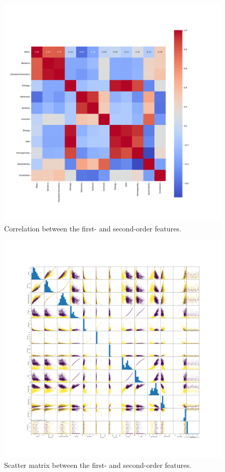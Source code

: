 \begin{figure}[H]
    \centering
    \includegraphics[width=\textwidth]{plots/correlation.png}
    \caption{Correlation between the first- and second-order features.}
    \label{fig:correlation}
\end{figure}

\begin{figure}[H]
    \centering
    \includegraphics[width=\textwidth]{plots/scatter_matrix.png}
    \caption{Scatter matrix between the first- and second-order features.}
    \label{fig:scatter_matrix}
\end{figure}
